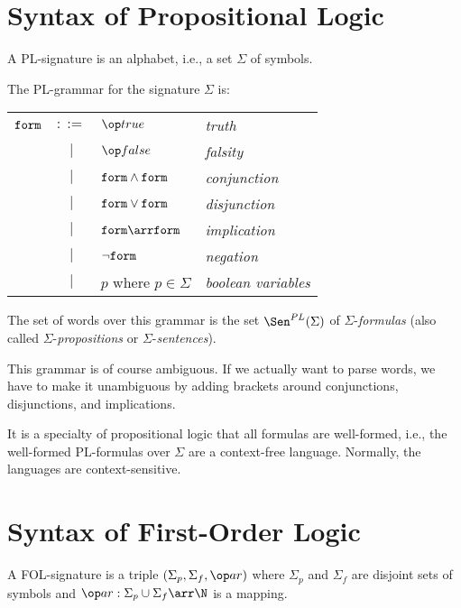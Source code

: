 \section{Syntax of Propositional Logic}

\begin{definition}[PL-signatures]
A PL-signature is an alphabet, i.e., a set $\Sigma$ of symbols.
\end{definition}

\begin{definition}[PL formulas]
The PL-grammar for the signature $\Sigma$ is:

\begin{tabular}{lcl@{\tb}l}
$\mathtt{form}$ & $::=$ & $\true$ & \emph{truth} \\
     &  $|$  & $\false$ & \emph{falsity} \\
     &  $|$  & $\mathtt{form} \wedge \mathtt{form}$ & \emph{conjunction} \\
     &  $|$  & $\mathtt{form} \vee \mathtt{form}$ & \emph{disjunction} \\
     &  $|$  & $\FORM \arr \FORM$ & \emph{implication} \\
     &  $|$  & $\neg \mathtt{form}$ & \emph{negation} \\
     &  $|$  & $p$ where $p\in\Sigma$ & \emph{boolean variables}\\
\end{tabular}

The set of words over this grammar is the set $\Sen^{PL}(\Sigma)$ of $\Sigma$-\emph{formulas} (also called $\Sigma$-\emph{propositions} or $\Sigma$-\emph{sentences}).
\end{definition}

This grammar is of course ambiguous. If we actually want to parse words, we have to make it unambiguous by adding brackets around conjunctions, disjunctions, and implications.

\begin{remark}
It is a specialty of propositional logic that all formulas are well-formed, i.e., the well-formed PL-formulas over $\Sigma$ are a context-free language.
Normally, the languages are context-sensitive.
\end{remark}

\section{Syntax of First-Order Logic}

\begin{definition}\label{def:fol:sig}
A FOL-signature is a triple $(\Sigma_p,\Sigma_f,\arit)$ where $\Sigma_p$ and $\Sigma_f$ are disjoint sets of symbols and $\arit:\Sigma_p\cup\Sigma_f\arr\N$ is a mapping.
\end{definition}

